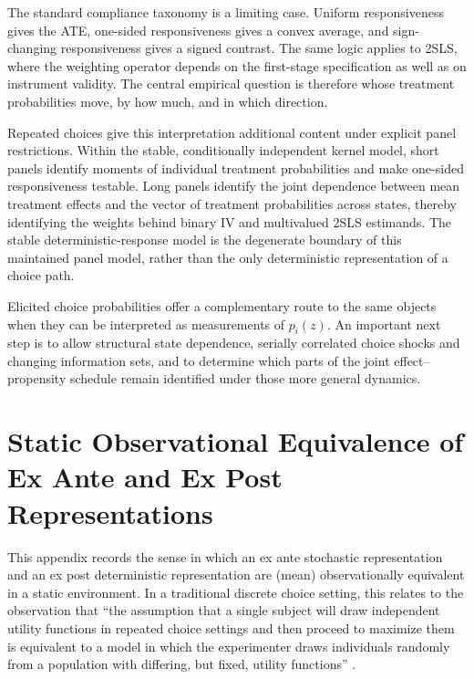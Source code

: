 \documentclass[11pt]{article}
\newcommand{\1}{\mathbf{1}}
\begin{document}
The standard compliance taxonomy is a limiting case. Uniform responsiveness gives the ATE, one-sided responsiveness gives a convex average, and sign-changing responsiveness gives a signed contrast. The same logic applies to 2SLS, where the weighting operator depends on the first-stage specification as well as on instrument validity. The central empirical question is therefore whose treatment probabilities move, by how much, and in which direction.

Repeated choices give this interpretation additional content under explicit panel restrictions. Within the stable, conditionally independent kernel model, short panels identify moments of individual treatment probabilities and make one-sided responsiveness testable. Long panels identify the joint dependence between mean treatment effects and the vector of treatment probabilities across states, thereby identifying the weights behind binary IV and multivalued 2SLS estimands. The stable deterministic-response model is the degenerate boundary of this maintained panel model, rather than the only deterministic representation of a choice path.

Elicited choice probabilities offer a complementary route to the same objects when they can be interpreted as measurements of $p_i(z)$. An important next step is to allow structural state dependence, serially correlated choice shocks and changing information sets, and to determine which parts of the joint effect--propensity schedule remain identified under those more general dynamics.

\newpage
\appendix

\section{Static Observational Equivalence of Ex Ante and Ex Post Representations}
\label{app:equivalence}

This appendix records the sense in which an ex ante stochastic representation and an ex post deterministic representation are (mean) observationally equivalent in a static environment.  In a traditional discrete choice setting, this relates to the observation that ``the assumption that a single subject will draw independent utility functions in repeated choice settings and then proceed to maximize them is equivalent to a model in which the experimenter draws individuals randomly from a population with differing, but fixed, utility functions'' \citep{mcfadden1976}.
\end{document}
